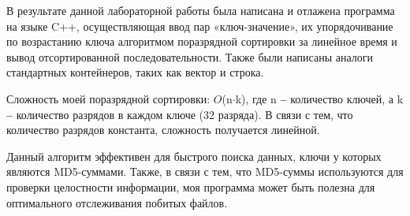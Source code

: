 \documentclass[12pt]{article}
\begin{document}
В результате данной лабораторной работы была написана и отлажена программа на языке C++, осуществляющая ввод пар «ключ-значение», их упорядочивание по возрастанию ключа алгоритмом поразрядной сортировки за линейное время и вывод отсортированной последовательности. Также были написаны аналоги стандартных контейнеров, таких как вектор и строка.

Сложность моей поразрядной сортировки: ${O}$(n$\cdot$k), где n \textbf{--} количество ключей, а k \textbf{--} количество разрядов в каждом ключе (32 разряда). В связи с тем, что количество разрядов константа, сложность получается линейной.

Данный алгоритм эффективен для быстрого поиска данных, ключи у которых являются MD5-суммами. Также, в связи с тем, что MD5-суммы используются для проверки целостности информации, моя программа может быть полезна для оптимального отслеживания побитых файлов. 
\end{document}

